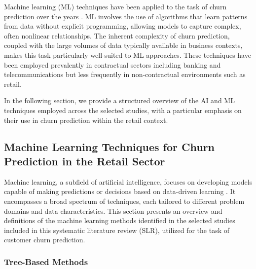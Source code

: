\documentclass[preprint,12pt]{elsarticle}
\begin{document}
Machine learning (ML) techniques have been applied to the task of churn prediction over the years \cite{churn-prediction-survery-manzoor-2024}. ML involves the use of algorithms that learn patterns from data without explicit programming, allowing models to capture complex, often nonlinear relationships. The inherent complexity of churn prediction, coupled with the large volumes of data typically available in business contexts, makes this task particularly well-suited to ML approaches. These techniques have been employed prevalently in contractual sectors including banking and telecommunications but less frequently in non-contractual environments such as retail.

In the following section, we provide a structured overview of the AI and ML techniques employed across the selected studies, with a particular emphasis on their use in churn prediction within the retail context. 

\subsection{Machine Learning Techniques for Churn Prediction in the Retail Sector}

Machine learning, a subfield of artificial intelligence, focuses on developing models capable of making predictions or decisions based on data-driven learning \cite{Sarker2021}. It encompasses a broad spectrum of techniques, each tailored to different problem domains and data characteristics. This section presents an overview and definitions of the machine learning methods identified in the selected studies included in this systematic literature review (SLR), utilized for the task of customer churn prediction.

\subsubsection{Tree-Based Methods}
\end{document}
